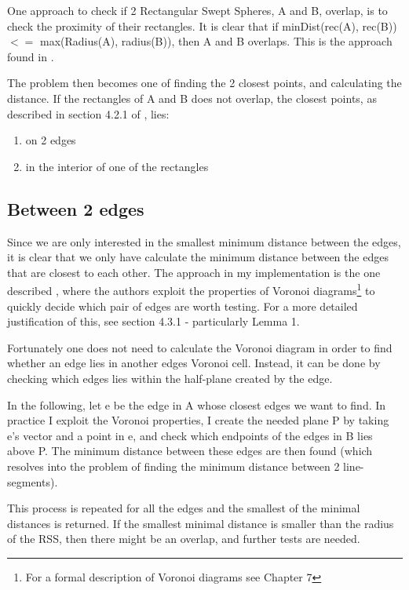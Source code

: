 One approach to check if 2 Rectangular Swept Spheres, A and B, overlap, is to check the proximity of their rectangles. It is clear that if minDist(rec(A), rec(B)) $<=$ max(Radius(A), radius(B)), then A and B overlaps. This is the approach found in \cite{Larsen99fastproximity}.

The problem then becomes one of finding the 2 closest points, and calculating the distance.
If the rectangles of A and B does not overlap, the closest points, as described in section 4.2.1 of \cite{Larsen9fastproximity}, lies:
\begin{enumerate}
\item on 2 edges
\item in the interior of one of the rectangles
\end{enumerate}

\subsection{Between 2 edges}
Since we are only interested in the smallest minimum distance between the edges, it is clear that we only have calculate the minimum distance between the edges that are closest to each other. The approach in my implementation is the one described \cite{Larsen99fastproximity}, where the authors exploit the properties of Voronoi diagrams\footnote{For a formal description of Voronoi diagrams see \cite{compgeom:2008} Chapter 7} to quickly decide which pair of edges are worth testing. For a more detailed justification of this, see \cite{Larsen99fastproximity} section 4.3.1 - particularly Lemma 1.  

Fortunately one does not need to calculate the Voronoi diagram in order to find whether an edge lies in another edges Voronoi cell. Instead, it can be done by checking which edges lies within the half-plane created by the edge.

In the following, let e be the edge in A whose closest edges we want to find.  
In practice I exploit the Voronoi properties, I create the needed plane P by taking e's vector and a point in e, and check which endpoints of the edges in B lies above P. The minimum distance between these edges are then found (which resolves into the problem of finding the minimum distance between 2 line-segments).

This process is repeated for all the edges and the smallest of the minimal distances is returned. If the smallest minimal distance is smaller than the radius of the RSS, then there might be an overlap, and further tests are needed.

